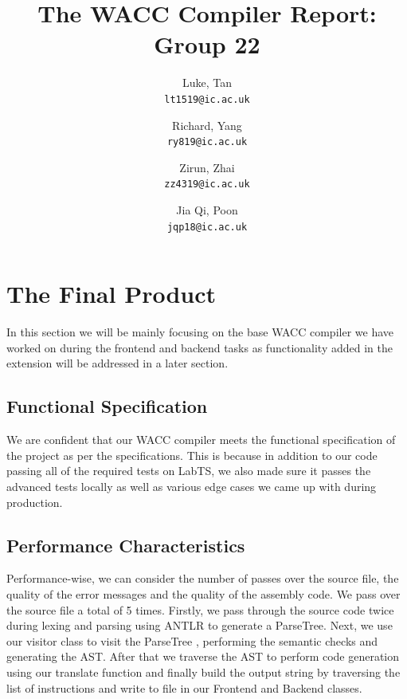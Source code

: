\documentclass[11pt,a4paper]{article}
\begin{document}
\title{The WACC Compiler Report: Group 22}
\author{
Luke, Tan \\
\texttt{lt1519@ic.ac.uk}
\and
Richard, Yang \\
\texttt{ry819@ic.ac.uk}
\and
Zirun, Zhai \\
\texttt{zz4319@ic.ac.uk}
\and
Jia Qi, Poon\\
\texttt{jqp18@ic.ac.uk}
}

\maketitle

\section{The Final Product}
In this section we will be mainly focusing on the base WACC compiler we have worked on during the frontend and backend tasks as functionality added in the extension will be addressed in a later section. 

\subsection{Functional Specification}
We are confident that our WACC compiler meets the functional specification of the project as per the specifications. This is because in addition to our code passing all of the required tests on LabTS, we also made sure it passes the advanced tests locally as well as various edge cases we came up with during production. 

\subsection{Performance Characteristics}
Performance-wise, we can consider the number of passes over the source file, the quality of the error messages and the quality of the assembly code. We pass over the source file a total of 5 times. Firstly, we pass through the source code twice during lexing and parsing using ANTLR to generate a ParseTree. Next, we use our visitor class to visit the ParseTree , performing the semantic checks and generating the AST. After that we traverse the AST to perform code generation using our translate function and finally build the output string by traversing the list of instructions and write to file in our Frontend and Backend classes.
\end{document}
